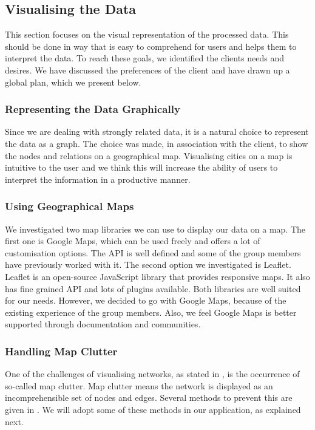 \subsection{Visualising the Data}

This section focuses on the visual representation of the processed data. This should be done in way that is easy to comprehend for users and helps them to interpret the data. To reach these goals, we identified the clients needs and desires. We have discussed the preferences of the client and have drawn up a global plan, which we present below.

\subsubsection{Representing the Data Graphically}

Since we are dealing with strongly related data, it is a natural choice to represent the data as a graph. The choice was made, in association with the client, to show the nodes and relations on a geographical map. Visualising cities on a map is intuitive to the user and we think this will increase the ability of users to interpret the information in a productive manner.

\subsubsection{Using Geographical Maps}

We investigated two map libraries we can use to display our data on a map. The first one is Google Maps, which can be used freely and offers a lot of customisation options. The API is well defined and some of the group members have previously worked with it. The second option we investigated is Leaflet. Leaflet is an open-source JavaScript library that provides responsive maps. It also has fine grained API and lots of plugins available.
Both libraries are well suited for our needs. However, we decided to go with Google Maps, because of the existing experience of the group members. Also, we feel Google Maps is better supported through documentation and communities.

\subsubsection{Handling Map Clutter}

One of the challenges of visualising networks, as stated in \cite{468391}, is the occurrence of so-called map clutter. Map clutter means the network is displayed as an incomprehensible set of nodes and edges.
Several methods to prevent this are given in \cite{468391}. We will adopt some of these methods in our application, as explained next.

